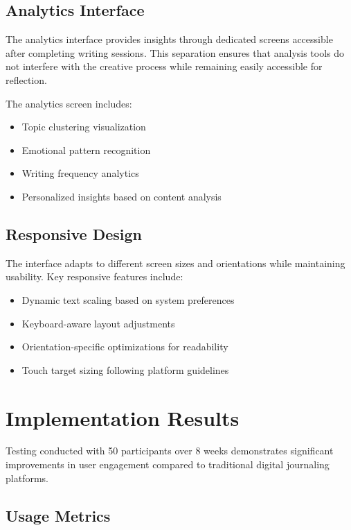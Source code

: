 \documentclass[conference]{IEEEtran}
\begin{document}
{\begin{IEEEkeywords}
\subsection{Analytics Interface}

The analytics interface provides insights through dedicated screens accessible after completing writing sessions. This separation ensures that analysis tools do not interfere with the creative process while remaining easily accessible for reflection.

The analytics screen includes:
\begin{itemize}
\item Topic clustering visualization
\item Emotional pattern recognition
\item Writing frequency analytics
\item Personalized insights based on content analysis
\end{itemize}

\subsection{Responsive Design}

The interface adapts to different screen sizes and orientations while maintaining usability. Key responsive features include:

\begin{itemize}
\item Dynamic text scaling based on system preferences
\item Keyboard-aware layout adjustments
\item Orientation-specific optimizations for readability
\item Touch target sizing following platform guidelines
\end{itemize}

\section{Implementation Results}

Testing conducted with 50 participants over 8 weeks demonstrates significant improvements in user engagement compared to traditional digital journaling platforms.

\subsection{Usage Metrics}


\end{IEEEkeywords}}
\end{document}
